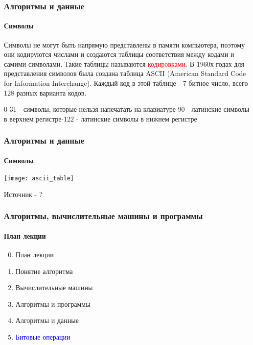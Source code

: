 \documentclass[aspectratio=169]{beamer}
\begin{document}
\begin{frame}
\frametitle{Алгоритмы и данные}
\framesubtitle{Символы}
\justifying
\small
Символы не могут быть напрямую представлены в памяти компьютера, поэтому они кодируются числами и создаются таблицы соответствия между кодами и самими символами. Такие таблицы называются \textcolor{red}{кодировками}.\newline\newline
В 1960х годах для представления символов была создана таблица ASCII (American Standard Code for Information Interchange).\newline\newline
Каждый код в этой таблице - 7 битное число, всего 128 разных варианта кодов.\newline

0-31 - символы, которые нельзя напечатать на клавиатуре-90 - латинские символы в верхнем регистре-122 - латинские символы в нижнем регистре\newline
\end{frame}

\begin{frame}
\frametitle{Алгоритмы и данные}
\framesubtitle{Символы}
\justifying
\small
\centering
\texttt{[image: ascii\_table]}

\tiny Источник - ?
\end{frame}

\begin{frame}
\frametitle{Алгоритмы, вычислительные машины и программы}
\framesubtitle{План лекции}

\begin{enumerate}
  \setcounter{enumi}{-1}
  \item{План лекции}
  \item{Понятие алгоритма}
  \item{Вычислительные машины}
  \item{Алгоритмы и программы}
  \item{Алгоритмы и данные}
  \item{\textcolor{blue}{Битовые операции}}

\end{enumerate}
\end{frame}
\end{document}
